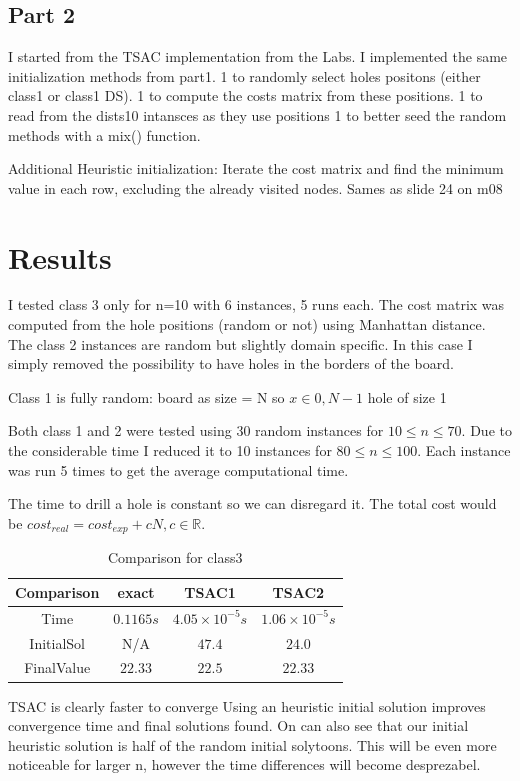 \documentclass[a4paper, 11pt]{article}
\begin{document}
			
			
			
			
			
		\subsection{Part 2}

			I started from the TSAC implementation from the Labs.
			I implemented the same initialization methods from part1.
			1 to randomly select holes positons (either class1 or class1 DS).
			1 to compute the costs matrix from these positions.
			1 to read from the dists10 intansces as they use positions
			1 to better seed the random methods with a mix() function.
			
			Additional Heuristic initialization:
				Iterate the cost matrix and find the minimum value in each row, excluding the already visited nodes.
				Sames as slide 24 on m08
						
	
	\section{Results}
		I tested class 3 only for n=10 with 6 instances, 5 runs each.
		The cost matrix was computed from the hole positions (random or not) using Manhattan distance.
		The class 2 instances are random but slightly domain specific.
		In this case I simply removed the possibility to have holes in the borders of the board.
		
		Class 1 is fully random:
		board as size = N
		so $ x \in {0,N-1}$
		hole of size 1
		
		Both class 1 and 2 were tested using 30 random instances for $ 10 \le n \le 70 $.
		Due to the considerable time I reduced it to 10 instances for $ 80 \le n \le 100 $.
		Each instance was run 5 times to get the average computational time.
		
		The time to drill a hole is constant so we can disregard it.
		The total cost would be $ cost_{real}  = cost_{exp} + cN, c\in \mathbb{R}$.
		
		\begin{table}[H]
			\centering
			\begin{tabular}{c|c|c|c}
				\textbf{Comparison}& \textbf{exact} & \textbf{TSAC1}  			& \textbf{TSAC2}  \\ \hline
				Time			& $ 0.1165 s $ 		& $ 4.05 \times 10^{-5} s $ 	& $ 1.06 \times 10^{-5} s $ \\ \hline
				InitialSol		& N/A		 		& $ 47.4 $ 						& $ 24.0 $ \\ \hline 
				FinalValue		& $ 22.33 $	 		& $ 22.5 $ 						& $ 22.33 $ \\  
			\end{tabular}
			\caption{Comparison for class3}
			\label{table:times3}
		\end{table}
		TSAC is clearly faster to converge
		Using an heuristic initial solution improves convergence time and final solutions found.
		On can also see that our initial heuristic solution is half of the random initial solytoons.
		This will be even more noticeable for larger n, however the time differences will become desprezabel.
		
\end{document}
